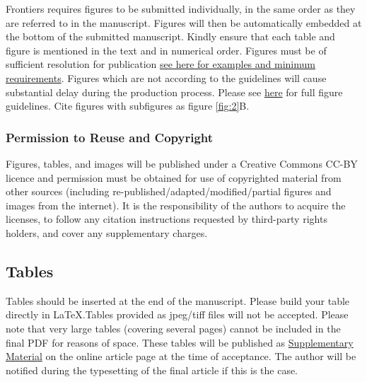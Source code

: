 \documentclass[utf8]{frontiersSCNS} %
\begin{document}
Frontiers requires figures to be submitted individually, in the same
order as they are referred to in the manuscript. Figures will then be
automatically embedded at the bottom of the submitted
manuscript. Kindly ensure that each table and figure is mentioned in
the text and in numerical order. Figures must be of sufficient
resolution for publication
\href{http://home.frontiersin.org/about/author-guidelines#ResolutionRequirements}{see
  here for examples and minimum requirements}. Figures which are not
according to the guidelines will cause substantial delay during the
production process. Please see
\href{http://home.frontiersin.org/about/author-guidelines#GeneralStyleGuidelinesforFigures}{here}
for full figure guidelines. Cite figures with subfigures as figure
\ref{fig:2}B.


\subsubsection{Permission to Reuse and Copyright}

Figures, tables, and images will be published under a Creative Commons
CC-BY licence and permission must be obtained for use of copyrighted
material from other sources (including
re-published/adapted/modified/partial figures and images from the
internet). It is the responsibility of the authors to acquire the
licenses, to follow any citation instructions requested by third-party
rights holders, and cover any supplementary charges.


\subsection{Tables}

Tables should be inserted at the end of the manuscript. Please build
your table directly in LaTeX.Tables provided as jpeg/tiff files will
not be accepted. Please note that very large tables (covering several
pages) cannot be included in the final PDF for reasons of space. These
tables will be published as
\href{http://home.frontiersin.org/about/author-guidelines#SupplementaryMaterial}{Supplementary
  Material} on the online article page at the time of acceptance. The
author will be notified during the typesetting of the final article if
this is the case.
\end{document}
